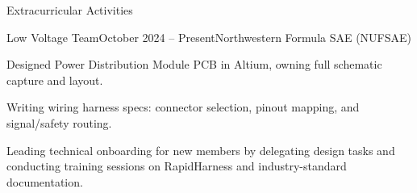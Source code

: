\documentclass[
    a4paper,
    9pt,
]{resume}
\begin{document}
\begin{rSection}{Extracurricular Activities}
    
	\begin{rSubsection}{Low Voltage Team}{October 2024 -- Present}{Northwestern Formula SAE (NUFSAE)}{}{}
		    \item Designed Power Distribution Module PCB in Altium, owning full schematic capture and layout.
            \item Writing wiring harness specs: connector selection, pinout mapping, and signal/safety routing.
            \item Leading technical onboarding for new members by delegating design tasks and conducting training sessions on RapidHarness and industry-standard documentation.

	\end{rSubsection}






\end{rSection}
\end{document}
